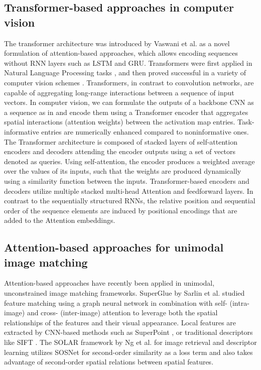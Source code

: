 \documentclass[10pt,journal]{IEEEtran}\usepackage{amsfonts}
\begin{document}
\subsection{Transformer-based approaches in computer vision}

The transformer architecture was introduced by Vaswani et al. \cite {Transformer} as a novel formulation of attention-based approaches, which
allows encoding sequences without RNN layers such as LSTM and GRU.
Transformers were first applied in Natural Language Processing tasks \cite {bert}, and then proved successful in a variety of computer vision schemes
\cite{AttentionAugmentedConvNets,
detr,ImageWorth16x16Words,ImageTransformer, SuperGlue}. Transformers, in
contrast to convolution networks, are capable of aggregating long-range
interactions between a sequence of input vectors. In computer vision, we can
formulate the outputs of a backbone CNN as a sequence as in \cite {detr,SuperGlue,ImageWorth16x16Words} and encode them using a Transformer
encoder that aggregates spatial interactions (attention weights) between the
activation map entries. Task-informative entries are numerically enhanced
compared to noninformative ones. The Transformer architecture is composed of
stacked layers of self-attention encoders and decoders attending the encoder
outputs using a set of vectors denoted as queries. Using self-attention, the
encoder produces a weighted average over the values of its inputs, such that
the weights are produced dynamically using a similarity function between the
inputs. Transformer-based encoders and decoders utilize multiple stacked
multi-head Attention and feedforward layers. In contrast to the sequentially
structured RNNs, the relative position and sequential order of the sequence
elements are induced by positional encodings that are added to the Attention
embeddings.

\subsection{Attention-based approaches for unimodal image matching}

Attention-based approaches have recently been applied in unimodal,
unconstrained image matching frameworks. SuperGlue \cite{SuperGlue} by
Sarlin et al. studied feature matching using a graph neural network in
combination with self- (intra-image) and cross- (inter-image) attention to
leverage both the spatial relationships of the features and their visual
appearance. Local features are extracted by CNN-based methods such as
SuperPoint \cite{SuperPoint}, or traditional descriptors like SIFT \cite {SIFT}. The SOLAR framework \cite{SOLAR} by Ng et al. for image retrieval
and descriptor learning utilizes SOSNet \cite{SOSNet} for second-order
similarity as a loss term and also takes advantage of second-order spatial
relations between spatial features.
\end{document}
